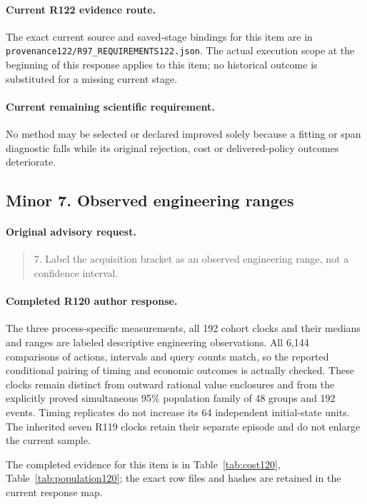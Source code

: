 \paragraph{Current R122 evidence route.}
The exact current source and saved-stage bindings for this item are in \nolinkurl{provenance122/R97_REQUIREMENTS122.json}. The actual execution scope at the beginning of this response applies to this item; no historical outcome is substituted for a missing current stage.
\paragraph{Current remaining scientific requirement.}
No method may be selected or declared improved solely because a fitting or span diagnostic falls while its original rejection, cost or delivered-policy outcomes deteriorate.

\subsection{Minor 7. Observed engineering ranges}
\label{response122:minor-7}

\paragraph{Original advisory request.}
\begin{quote}
7. Label the acquisition bracket as an observed engineering range, not a confidence interval.
\end{quote}

\paragraph{Completed R120 author response.}
The three process-specific measurements, all 192 cohort clocks and their medians and ranges are labeled descriptive engineering observations. All 6,144 comparisons of actions, intervals and query counts match, so the reported conditional pairing of timing and economic outcomes is actually checked. These clocks remain distinct from outward rational value enclosures and from the explicitly proved simultaneous 95\% population family of 48 groups and 192 events. Timing replicates do not increase its 64 independent initial-state units. The inherited seven R119 clocks retain their separate episode and do not enlarge the current sample.

The completed evidence for this item is in Table~\ref{tab:cost120}, Table~\ref{tab:population120}; the exact row files and hashes are retained in the current response map.

